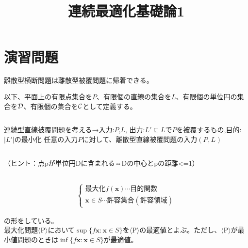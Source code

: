 \documentclass[a4j]{jarticle}
\date{}
\title{連続最適化基礎論1}
\begin{document}
\maketitle

\section{演習問題}

離散型横断問題は離散型被覆問題に帰着できる。

以下、平面上の有限点集合を$P$、有限個の直線の集合を$L$、有限個の単位円の集合を$\cal{D}$、有限個の集合を$\cal{C}$として定義する。

\subsection{}

連続型直線被覆問題を考える→入力:$P$,$L$, 出力:$L'\subseteq L$で$P$を被覆するもの,目的:$|L'|$の最小化
任意の入力$P$に対して、離散型直線被覆問題の入力$(P^{},L^{})$

\subsection{}

\subsection{}

\subsection{}
（ヒント：点pが単位円Dに含まれる⇔Dの中心とpの距離<=1）

\subsection{}






\begin{eqnarray*}
  \begin{cases}最大化f(\bm{x})\cdots 目的関数\\\bm{x}\in S\cdots 許容集合(許容領域)\end{cases}
\end{eqnarray*}

の形をしている。\\

最大化問題$\langle$P$\rangle$において$\sup\{ f{\bm{x}:\bm{x}\in S}\}$を$\langle$P$\rangle$の最適値とよぶ。ただし、$\langle$P$\rangle$が最小値問題のときは$\inf\{ f{\bm{x}:\bm{x}\in S}\}$が最適値。\\
\end{document}

